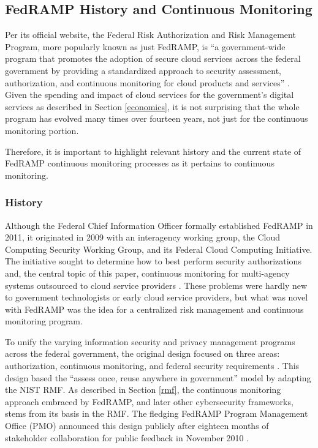 \documentclass{jdf}
\begin{document}
\subsection{FedRAMP History and Continuous Monitoring}

Per its official website, the Federal Risk Authorization and Risk Management Program, more popularly known as just FedRAMP, is ``a government-wide program that promotes the adoption of secure cloud services across the federal government by providing a standardized approach to security assessment, authorization, and continuous monitoring for cloud products and services'' \citeyear{fedramp_definition25}. Given the spending and impact of cloud services for the government's digital services as described in Section \ref{economics}, it is not surprising that the whole program has evolved many times over fourteen years, not just for the continuous monitoring portion.

Therefore, it is important to highlight relevant history and the current state of FedRAMP continuous monitoring processes as it pertains to continuous monitoring.

\subsubsection{History} \label{fedramp_history}

Although the Federal Chief Information Officer formally established FedRAMP in 2011, it originated in 2009 with an interagency working group, the Cloud Computing Security Working Group, and its Federal Cloud Computing Initiative. The initiative sought to determine how to best perform security authorizations and, the central topic of this paper, continuous monitoring for multi-agency systems outsourced to cloud service providers \cite[p.~239]{metheny17}. These problems were hardly new to government technologists or early cloud service providers, but what was novel with FedRAMP was the idea for a centralized risk management and continuous monitoring program.

To unify the varying information security and privacy management programs across the federal government, the original design focused on three areas: authorization, continuous monitoring, and federal security requirements \cite[p.~240]{metheny17}. This design based the ``assess once, reuse anywhere in government'' model by adapting the NIST RMF. As described in Section \ref{rmf}, the continuous monitoring approach embraced by FedRAMP, and later other cybersecurity frameworks, stems from its basis in the RMF. The fledging FedRAMP Program Management Office (PMO) announced this design publicly after eighteen months of stakeholder collaboration for public feedback in November 2010 \cite[p.~240]{metheny17}.
\end{document}
